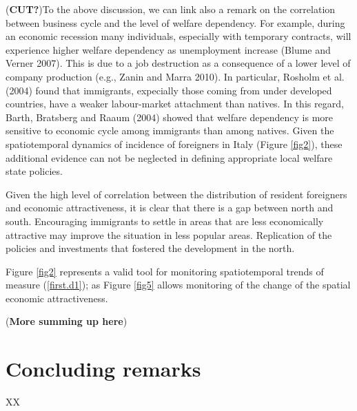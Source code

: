 \documentclass[10pt]{article}
\theoremstyle{definition}
\theoremstyle{plain}
\begin{document}
(\textbf{CUT?})To the above discussion, we can link also a remark on the correlation between business cycle and the level of welfare dependency. For example, during an economic recession many individuals, especially with temporary contracts, will experience higher welfare dependency as unemployment increase (Blume and Verner 2007). This is due to a job destruction as a consequence of a lower level of company production (e.g., Zanin and Marra 2010). In particular, Rosholm et al. (2004) found that immigrants, expecially those coming from under developed countries, have a weaker labour-market attachment than natives. In this regard, Barth, Bratsberg and Raaum (2004) showed that welfare dependency is more sensitive to economic cycle among immigrants than among natives. Given the spatiotemporal dynamics of incidence of foreigners in Italy (Figure \ref{fig2}), these additional evidence can not be neglected in defining appropriate local welfare state policies.

Given the high level of correlation between the distribution of resident foreigners and economic attractiveness, it is clear that there is a gap between north and south. Encouraging immigrants to settle in areas that are less economically attractive may improve the situation in less popular areas. Replication of the policies and investments that fostered the development in the north.

Figure \ref{fig2} represents a valid tool for monitoring spatiotemporal trends of measure (\ref{first.d1}); as Figure \ref{fig5} allows monitoring of the change of the spatial economic attractiveness.

(\textbf{More summing up here})



\section{Concluding remarks \label{CONC}}
XX
\end{document}
